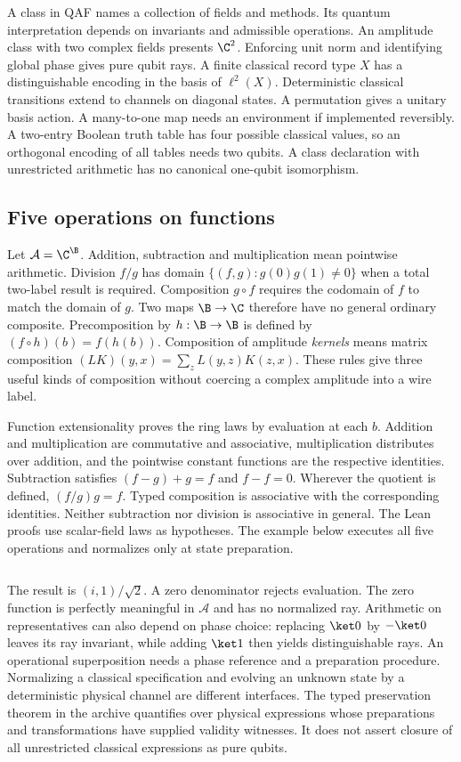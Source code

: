 A class in QAF names a collection of fields and methods. Its quantum interpretation depends on invariants and admissible operations. An amplitude class with two complex fields presents $\C^2$. Enforcing unit norm and identifying global phase gives pure qubit rays. A finite classical record type $X$ has a distinguishable encoding in the basis of $\ell^2(X)$. Deterministic classical transitions extend to channels on diagonal states. A permutation gives a unitary basis action. A many-to-one map needs an environment if implemented reversibly. A two-entry Boolean truth table has four possible classical values, so an orthogonal encoding of all tables needs two qubits. A class declaration with unrestricted arithmetic has no canonical one-qubit isomorphism.

\subsection{Five operations on functions}
Let $\mathcal A=\C^\B$. Addition, subtraction and multiplication mean pointwise arithmetic. Division $f/g$ has domain $\{(f,g):g(0)g(1)\ne0\}$ when a total two-label result is required. Composition $g\circ f$ requires the codomain of $f$ to match the domain of $g$. Two maps $\B\to\C$ therefore have no general ordinary composite. Precomposition by $h:\B\to\B$ is defined by $(f\circ h)(b)=f(h(b))$. Composition of amplitude \emph{kernels} means matrix composition $(LK)(y,x)=\sum_z L(y,z)K(z,x)$. These rules give three useful kinds of composition without coercing a complex amplitude into a wire label.

Function extensionality proves the ring laws by evaluation at each $b$. Addition and multiplication are commutative and associative, multiplication distributes over addition, and the pointwise constant functions are the respective identities. Subtraction satisfies $(f-g)+g=f$ and $f-f=0$. Wherever the quotient is defined, $(f/g)g=f$. Typed composition is associative with the corresponding identities. Neither subtraction nor division is associative in general. The Lean proofs use scalar-field laws as hypotheses. The example below executes all five operations and normalizes only at state preparation.
\inputminted[firstline=55,fontsize=\footnotesize]{qaf}{examples/prefix/algebra.qaf}
The result is $(i,1)/\sqrt2$. A zero denominator rejects evaluation. The zero function is perfectly meaningful in $\mathcal A$ and has no normalized ray. Arithmetic on representatives can also depend on phase choice: replacing $\ket0$ by $-\ket0$ leaves its ray invariant, while adding $\ket1$ then yields distinguishable rays. An operational superposition needs a phase reference and a preparation procedure. Normalizing a classical specification and evolving an unknown state by a deterministic physical channel are different interfaces. The typed preservation theorem in the archive quantifies over physical expressions whose preparations and transformations have supplied validity witnesses. It does not assert closure of all unrestricted classical expressions as pure qubits.

